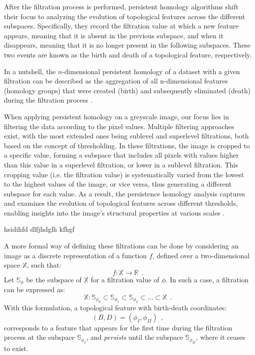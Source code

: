 \documentclass[12pt]{mythesis}
\begin{document}
After the filtration process is performed, persistent homology algorithms shift their focus to analyzing the evolution of topological features across the different subspaces. Specifically, they record the filtration value at which a new feature appears, meaning that it is absent in the previous subspace, and when it disappears, meaning that it is no longer present in the following subspaces. These two events are known as the birth and death of a topological feature, respectively. 

In a nutshell, the $n$-dimensional persistent homology of a dataset with a given filtration can be described as the aggregation of all n-dimensional features (homology groups) that were created (birth) and subsequently eliminated (death) during the filtration process \citep{ph_filtration}.

When applying persistent homology on a greyscale image, our focus lies in filtering the data according to the pixel values. Multiple filtering approaches exist, with the most extended ones being sublevel and superlevel filtrations, both based on the concept of thresholding. In these filtrations, the image is cropped to a specific value, forming a subspace that includes all pixels with values higher than this value in a superlevel filtration, or lower in a sublevel filtration. This cropping value (i.e. the filtration value) is systematically varied from the lowest to the highest values of the image, or vice versa, thus generating a different subspace for each value. As a result, the persistence homology analysis captures and examines the evolution of topological features across different thresholds, enabling insights into the image's structural properties at various scales \citep{ph_image_filtration}.

hsidihfd
dlfjhdglh
kfhgf


A more formal way of defining these filtrations can be done by considering an image as a discrete representation of a function $f$, defined over a two-dimensional space $\mathbb{X}$, such that: 
\begin{equation}
    f :  \mathbb{X} \longrightarrow  \mathbb{R} \ \ .
\end{equation}
Let $\mathbb{S} _\phi$ be the subspace of $\mathbb{X}$ for a filtration value of $\phi$. In such a case, a filtration can be expressed as:
\begin{equation}
    \mathbb{X}: \mathbb{S}_{\phi_0} \subset \mathbb{S}_{\phi_1} \subset \mathbb{S}_{\phi_2}\subset... \subset \mathbb{X}\ \ .
\end{equation}
With this formulation, a topological feature with birth-death coordinates:
\begin{equation}
(B, D) = (\phi_ I, \phi _ {II}) \ \ ,
\end{equation} 
corresponds to a feature that appears for the first time during the filtration process at the subspace $\mathbb{S}_{\phi _ I}$, and \textit{persists} until the subspace $\mathbb{S}_{\phi _ {II}}$, where it ceases to exist.
\end{document}
